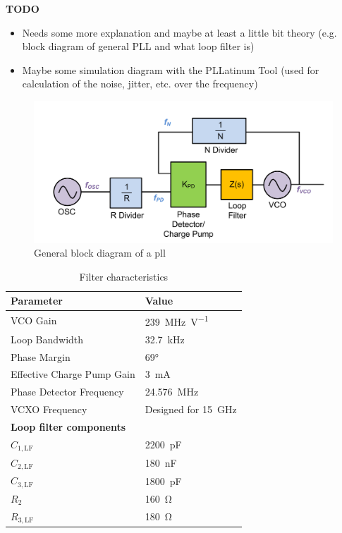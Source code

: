 \textbf{TODO} 
\begin{itemize}
	\item Needs some more explanation and maybe at least a little bit theory (e.g. block diagram of general PLL and what loop filter is)
	\item Maybe some simulation diagram with the PLLatinum Tool (used for calculation of the noise, jitter, etc. over the frequency)
\end{itemize}

\begin{figure}[tbh]
	\centering
	\includegraphics[width = \textwidth]{chap/04-work/img/pll_block}
	\caption[PLL block diagram]{General block diagram of a \gls{pll}}
	\label{fig:pll_block}
\end{figure}


\begin{table}[tbh]
	\caption[LMX2594 Filter characteristics]{Filter characteristics}
	\label{tab:lmx2594_filter}
	\centering
	\begin{tabularx}{\textwidth}{Xl}
		\toprule
		\textbf{Parameter}                         & \textbf{Value}             \\ \bottomrule
		VCO Gain                                   & \SI{239}{\MHz\per\volt}    \\
		Loop Bandwidth                             & \SI{32.7}{\kHz}            \\
		Phase Margin                               & \ang{69}                   \\
		Effective Charge Pump Gain                 & \SI{3}{\milli\ampere}      \\
		Phase Detector Frequency                   & \SI{24.576}{\MHz}          \\
		VCXO Frequency                             & Designed for \SI{15}{\GHz} \\
		[0.3cm]
		 \textbf{Loop filter components} &                            \\
		$C_{1,\text{LF}}$                          & \SI{2200}{\pico\farad}     \\
		$C_{2,\text{LF}}$                          & \SI{180}{\nano\farad}      \\
		$C_{3,\text{LF}}$                          & \SI{1800}{\pico\farad}     \\
		$R_{2}$                                    & \SI{160}{\ohm}             \\
		$R_{3,\text{LF}}$                          & \SI{180}{\ohm}             \\ \bottomrule
	\end{tabularx}
\end{table}

